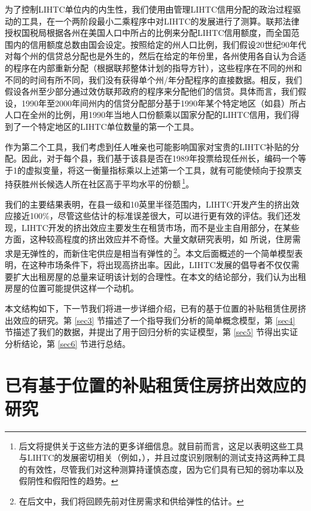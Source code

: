 \documentclass[lang=cn,11pt,a4paper]{paper}
\begin{document}
为了控制LIHTC单位内的内生性，我们使用由管理LIHTC信用分配的政治过程驱动的工具，在一个两阶段最小二乘程序中对LIHTC的发展进行了测算。联邦法律授权国税局根据各州在美国人口中所占的比例来分配LIHTC信用额度，而全国范围内的信用额度总数由国会设定。按照给定的州人口比例，我们假设20世纪90年代对每个州的信贷总分配也是外生的，然后在给定的年份里，各州使用各自认为合适的程序在内部重新分配（根据联邦整体计划的指导方针），这些程序在不同的州和不同的时间有所不同，我们没有获得单个州/年分配程序的直接数据。相反，我们假设各州至少部分通过效仿联邦政府的程序来分配他们的信贷。具体而言，我们假设，1990年至2000年间州内的信贷分配部分基于1990年某个特定地区（如县）所占人口在全州的比例，用1990年当地人口份额乘以国家分配的LIHTC信用，我们得到了一个特定地区的LIHTC单位数量的第一个工具。

作为第二个工具，我们考虑到任人唯亲也可能影响国家对宝贵的LIHTC补贴的分配。因此，对于每个县，我们基于该县是否在1989年投票给现任州长，编码一个等于1的虚拟变量，将这一衡量指标乘以上述第一个工具，就有可能使倾向于投票支持获胜州长候选人所在社区高于平均水平的份额\,\footnote{后文将提供关于这些方法的更多详细信息。就目前而言，这足以表明这些工具与LIHTC的发展密切相关（例如，\citep{Stock200580,Murray2006111}），并且过度识别限制的测试支持这两种工具的有效性，尽管我们对这种测算持谨慎态度，因为它们具有已知的弱功率以及假阴性和假阳性的趋势。}。

我们的主要结果表明，在县一级和10英里半径范围内，LIHTC开发产生的挤出效应接近100\%，尽管这些估计的标准误差很大，可以进行更有效的评估。我们还发现，LIHTC开发的挤出效应主要发生在租赁市场，而不是业主自用部分，在某些方面，这种较高程度的挤出效应并不奇怪。大量文献研究表明，如 \cite{Hanushek1980449} 所说，住房需求是无弹性的，而新住宅供应是相当有弹性的\,\footnote{在后文中，我们将回顾先前对住房需求和供给弹性的估计。}。本文后面概述的一个简单模型表明，在这种市场条件下，将出现高挤出率。因此，LIHTC发展的倡导者不仅仅需要扩大出租房屋的总量来证明该计划的合理性。在本文的结论部分，我们认为出租房屋的位置可能提供这样一个动机。

本文结构如下，下一节我们将进一步详细介绍，已有的基于位置的补贴租赁住房挤出效应的研究。第 \ref{sec3} 节描述了一个指导我们分析的简单概念模型，第 \ref{sec4} 节描述了我们的数据，并提出了用于回归分析的实证模型，第 \ref{sec5} 节得出实证分析结论，第 \ref{sec6} 节进行总结。

\section{已有基于位置的补贴租赁住房挤出效应的研究}
\end{document}
